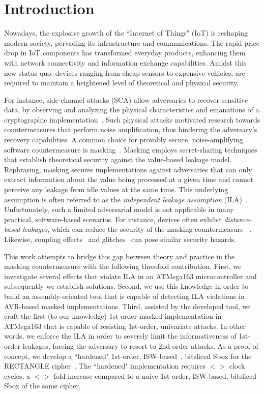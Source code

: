 \section{Introduction}
Nowadays, the explosive growth of the ``Internet of Things" (IoT) is reshaping modern society, pervading its infrastructure and communications.
The rapid price drop in IoT components has transformed everyday products, enhancing them with network connectivity and information exchange capabilities. Amidst this new status quo, devices ranging from cheap sensors to expensive vehicles, are required to maintain a heightened level of theoretical and physical security.

For instance, side-channel attacks (SCA) allow adversaries to recover sensitive data, by observing and analyzing the
physical characteristics and emanations of a cryptographic implementation~\cite{DBLP:conf/crypto/KocherJJ99}. Such physical attacks motivated research towards countermeasures that perform noise amplification, thus hindering the adversary's recovery capabilities. A common choice for provably secure, noise-amplifying software countermeasure is masking~\cite{DBLP:conf/crypto/ChariJRR99,DBLP:conf/crypto/IshaiSW03}. Masking employs secret-sharing techniques that establish theoretical security against the value-based leakage model. Rephrasing, masking secures implementations against adversaries that can only extract information about the value being processed at a given time and cannot perceive any leakage from idle values at the same time. This underlying assumption is often referred to as the \emph{independent leakage assumption} (ILA)~\cite{DBLP:conf/eurocrypt/RenauldSVKF11}. Unfortunately, such a limited adversarial model is not applicable in many practical, software-based scenarios. For instance, devices often exhibit \emph{distance-based leakages}, which can reduce the security of the masking countermeasure ~\cite{DBLP:conf/cardis/BalaschGGRS14, DBLP:journals/iacr/GrootPPSB16}. Likewise, coupling effects~\cite{DBLP:conf/eurocrypt/RenauldSVKF11} and glitches~\cite{DBLP:conf/ches/MangardS06} can pose similar security hazards.

This work attempts to bridge this gap between theory and practice in the masking countermeasure with the following threefold contribution. First, we investigate several effects that violate ILA in an ATMega163 microcontroller and subsequently we establish solutions. Second, we use this knowledge in order to build an assembly-oriented tool that is capable of detecting ILA violations in AVR-based masked implementations. Third, assisted by the developed tool, we craft the first (to our knowledge) 1st-order masked implementation in ATMega163 that is capable of resisting 1st-order, univariate attacks. In other words, we enforce the ILA in order to severely limit the informativeness of 1st-order leakages, forcing the adversary to resort to 2nd-order attacks. As a proof of concept, we develop a ``hardened" 1st-order, ISW-based~\cite{DBLP:conf/crypto/IshaiSW03}, bitsliced Sbox for the RECTANGLE cipher~\cite{DBLP:journals/chinaf/ZhangBLR0V15}. The ``hardened" implementation requires $<>$ clock cycles, a $<>$-fold increase compared to a naive 1st-order, ISW-based, bitsliced Sbox of the same cipher. 

